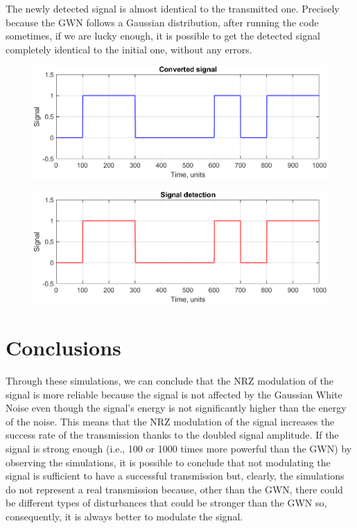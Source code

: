 \noindent The newly detected signal is almost identical to the transmitted one. Precisely because the GWN follows a Gaussian distribution, after running the code sometimes, if we are lucky enough, it is possible to get the detected signal completely identical to the initial one, without any errors.

\begin{figure}[h!]
    \centering
    \includegraphics[width = .6\textwidth]{lab-1/imgs/converted_signal.png}
\end{figure}

\begin{figure}[h!]
    \centering
    \includegraphics[width = .6\textwidth]{lab-1/imgs/NRZ_detection_SNR10_2.png}
\end{figure}

% 
% 
\section*{Conclusions}\label{conclusions}
Through these simulations, we can conclude that the NRZ modulation of the signal is more reliable because the signal is not affected by the Gaussian White Noise even though the signal's energy is not significantly higher than the energy of the noise. This means that the NRZ modulation of the signal increases the success rate of the transmission thanks to the doubled signal amplitude. If the signal is strong enough (i.e., 100 or 1000 times more powerful than the GWN) by observing the simulations, it is possible to conclude that not modulating the signal is sufficient to have a successful transmission but, clearly, the simulations do not represent a real transmission because, other than the GWN, there could be different types of disturbances that could be stronger than the GWN so, consequently, it is always better to modulate the signal. 

